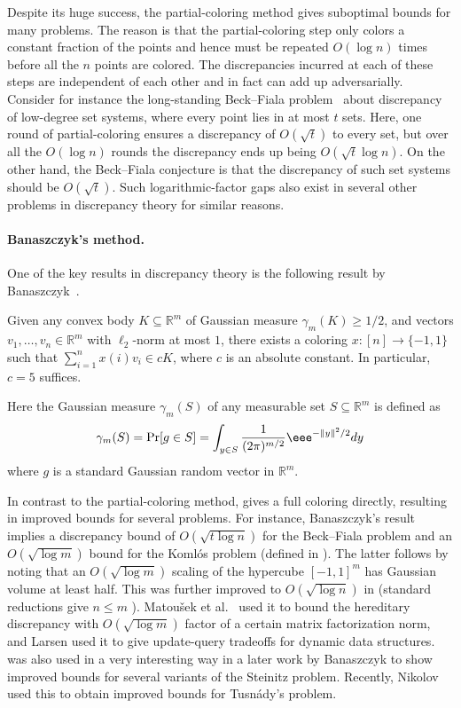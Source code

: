 \documentclass{toc}
\begin{document}
Despite its huge success, the partial-coloring method gives
%
suboptimal    %
bounds for many problems. The reason is that the partial-coloring step only colors a constant fraction of the points and hence must be repeated $O(\log n)$ times before all the $n$ points are colored. The discrepancies incurred at each of these steps are independent of each other and in fact can add up adversarially. Consider for instance the long-standing Beck--Fiala problem~\cite{BF81} about discrepancy of low-degree set systems, where every point lies in at most $t$ sets. Here, one round of partial-coloring ensures a discrepancy of $O(\sqrt{t})$ to every set, but over all the $O(\log n)$ rounds the discrepancy ends up being $O(\sqrt{t}\log n)$. On the other hand, the Beck--Fiala conjecture is that the discrepancy of such set systems should be $O(\sqrt{t})$. Such logarithmic-factor gaps also exist in several other problems in discrepancy
theory  %
for similar reasons.

\paragraph{Banaszczyk's method.} One of the key results in discrepancy
theory %
is the following result by
Banaszczyk~\cite{B97}.  %
%
%
\begin{theorem}[Banaszczyk]\label{thm:bana}  %
Given any convex body $K\subseteq \mathbb{R}^m$ of Gaussian measure $\gamma_m(K)\ge 1/2$, and vectors $v_1,\dots,v_n\in\mathbb{R}^m$ with $\ell_2$-norm at most $1$, there exists a coloring $x:[n]\rightarrow\{-1,1\}$ such that $\sum_{i=1}^n x(i) v_i \in cK$, where $c$ is an absolute constant. In particular, $c=5$ suffices.
\end{theorem}

Here the Gaussian measure $\gamma_m(S)$ of any measurable set $S\subseteq \mathbb{R}^m$ is defined as
\[\gamma_m(S)= \Pr[g \in S]= \int_{y\in S} \frac{1}{(2\pi)^{m/2}}  \eee^{-\| y\|^2/2}  dy \]
where $g$ is a standard Gaussian random vector in $\mathbb{R}^m$.

In contrast to the partial-coloring method,  gives a full coloring directly, resulting in improved bounds for several problems. For instance, Banaszczyk's result implies a discrepancy bound of $O(\sqrt{t\log n})$ for the Beck--Fiala problem and an $O(\sqrt{\log m})$ bound for the Koml\'{o}s problem (defined in ). The latter follows by noting that an $O(\sqrt{\log m})$ scaling of the hypercube $[-1,1]^m$ has Gaussian volume at least half. This was further improved to $O(\sqrt{\log n})$ in \cite{barthe2005} (standard reductions give $n \le m$ \cite{BF81}). Matou\v{s}ek et al.~\cite{MNT14} used it to bound the hereditary discrepancy with $O(\sqrt{\log m})$ factor of a certain matrix factorization norm, and Larsen \cite{Lar14}
used it to give update-query tradeoffs for dynamic data structures.
 was also used in a very interesting way in a later work by Banaszczyk \cite{Bana12} to show improved bounds for several variants of the Steinitz problem. Recently, Nikolov \cite{Sasho16} used this to obtain improved bounds for Tusn\'{a}dy's problem.
\end{document}

